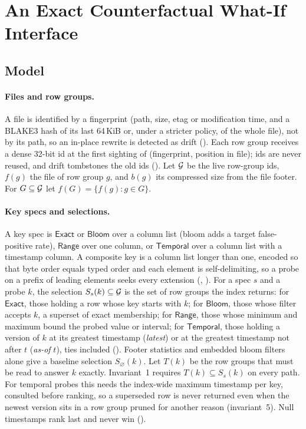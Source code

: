 \section{An Exact Counterfactual What-If Interface}\label{sec:whatif}

\subsection{Model}\label{sec:model}

\paragraph{Files and row groups.} A file is identified by a fingerprint (path,
size, etag or modification time, and a BLAKE3 hash of its last 64\,KiB or,
under a stricter policy, of the whole file), not by its path, so an in-place
rewrite is detected as drift (). Each
row group receives a dense 32-bit id at the first sighting of (fingerprint,
position in file); ids are never reused, and drift tombstones the old ids
(). Let $\mathcal{G}$ be the live row-group ids, $f(g)$ the file of row group
$g$, and $b(g)$ its compressed size from the file footer. For
$G \subseteq \mathcal{G}$ let $f(G) = \{ f(g) : g \in G \}$.

\paragraph{Key specs and selections.} A key spec is $\mathsf{Exact}$ or
$\mathsf{Bloom}$ over a column list (bloom adds a target false-positive rate),
$\mathsf{Range}$ over one column, or $\mathsf{Temporal}$ over a column list
with a timestamp column. A composite key is a column list longer than one,
encoded so that byte order equals typed order and each element is
self-delimiting, so a probe on a prefix of leading elements seeks every
extension (, ). For a spec $s$ and a probe $k$, the selection $S_s(k) \subseteq \mathcal{G}$
is the set of row groups the index returns: for $\mathsf{Exact}$, those holding
a row whose key starts with $k$; for $\mathsf{Bloom}$, those whose filter
accepts $k$, a superset of exact membership; for $\mathsf{Range}$, those whose
minimum and maximum bound the probed value or interval; for $\mathsf{Temporal}$,
those holding a version of $k$ at its greatest timestamp (\emph{latest}) or at
the greatest timestamp not after $t$ (\emph{as-of} $t$), ties included
(). Footer statistics and embedded bloom filters alone give a
baseline selection $S_\varnothing(k)$. Let $T(k)$ be the row groups that must
be read to answer $k$ exactly. Invariant~1 requires $T(k) \subseteq S_s(k)$ on
every path. For temporal probes this needs the index-wide maximum timestamp per
key, consulted before ranking, so a superseded row is never returned even when
the newest version sits in a row group pruned for another reason
(invariant~5). Null timestamps rank last and never win ().

